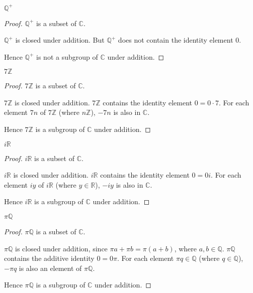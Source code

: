 \begin{exercise}
    $\mathbb{Q}^{+}$
\end{exercise}

\begin{proof}
    $\mathbb{Q}^{+}$ is a subset of $\mathbb{C}$.

    $\mathbb{Q}^{+}$ is closed under addition. But $\mathbb{Q}^{+}$ does not contain the identity element $0$.

    Hence $\mathbb{Q}^{+}$ is not a subgroup of $\mathbb{C}$ under addition.
\end{proof}

\begin{exercise}
    $7\mathbb{Z}$
\end{exercise}

\begin{proof}
    $7\mathbb{Z}$ is a subset of $\mathbb{C}$.

    $7\mathbb{Z}$ is closed under addition. $7\mathbb{Z}$ contains the identity element $0 = 0\cdot 7$. For each element $7n$ of $7\mathbb{Z}$ (where $n\mathbb{Z}$), $-7n$ is also in $\mathbb{C}$.

    Hence $7\mathbb{Z}$ is a subgroup of $\mathbb{C}$ under addition.
\end{proof}

\begin{exercise}
    $i\mathbb{R}$
\end{exercise}

\begin{proof}
    $i\mathbb{R}$ is a subset of $\mathbb{C}$.

    $i\mathbb{R}$ is closed under addition. $i\mathbb{R}$ contains the identity element $0 = 0i$. For each element $iy$ of $i\mathbb{R}$ (where $y\in\mathbb{R}$), $-iy$ is also in $\mathbb{C}$.

    Hence $i\mathbb{R}$ is a subgroup of $\mathbb{C}$ under addition.
\end{proof}

\begin{exercise}
    $\pi\mathbb{Q}$
\end{exercise}

\begin{proof}
    $\pi\mathbb{Q}$ is a subset of $\mathbb{C}$.

    $\pi\mathbb{Q}$ is closed under addition, since $\pi a + \pi b = \pi (a + b)$, where $a, b\in\mathbb{Q}$. $\pi\mathbb{Q}$ contains the additive identity $0 = 0\pi$. For each element $\pi q\in\mathbb{Q}$ (where $q\in\mathbb{Q}$), $-\pi q$ is also an element of $\pi\mathbb{Q}$.

    Hence $\pi\mathbb{Q}$ is a subgroup of $\mathbb{C}$ under addition.
\end{proof}

